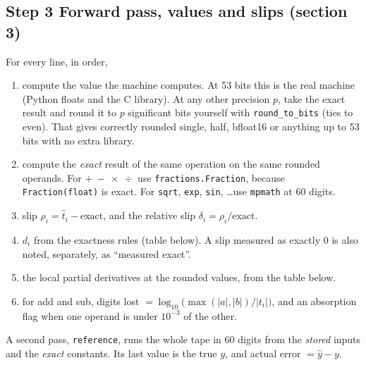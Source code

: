 \documentclass[11pt]{article}
\begin{document}
\subsection*{Step 3 \quad Forward pass, values and slips (section 3)}
For every line, in order,
\begin{enumerate}
\item compute the value the machine computes. At 53 bits this is the real machine (Python floats and the C library). At any other precision $p$, take the exact result and round it to $p$ significant bits yourself with \texttt{round\_to\_bits} (ties to even). That gives correctly rounded single, half, bfloat16 or anything up to 53 bits with no extra library.
\item compute the \emph{exact} result of the same operation on the same rounded operands. For $+\ -\ \times\ \div$ use \texttt{fractions.Fraction}, because \texttt{Fraction(float)} is exact. For \texttt{sqrt}, \texttt{exp}, \texttt{sin}, \ldots use \texttt{mpmath} at 60 digits.
\item slip $\rho_i = \hat t_i - \text{exact}$, and the relative slip $\delta_i = \rho_i/\text{exact}$.
\item $d_i$ from the exactness rules (table below). A slip measured as exactly $0$ is also noted, separately, as ``measured exact''.
\item the local partial derivatives at the rounded values, from the table below.
\item for add and sub, digits lost $= \log_{10}\big(\max(|a|,|b|)/|t_i|\big)$, and an absorption flag when one operand is under $10^{-3}$ of the other.
\end{enumerate}
A second pass, \texttt{reference}, runs the whole tape in 60 digits from the \emph{stored} inputs and the \emph{exact} constants. Its last value is the true $y$, and actual error $= \hat y - y$.
\end{document}
